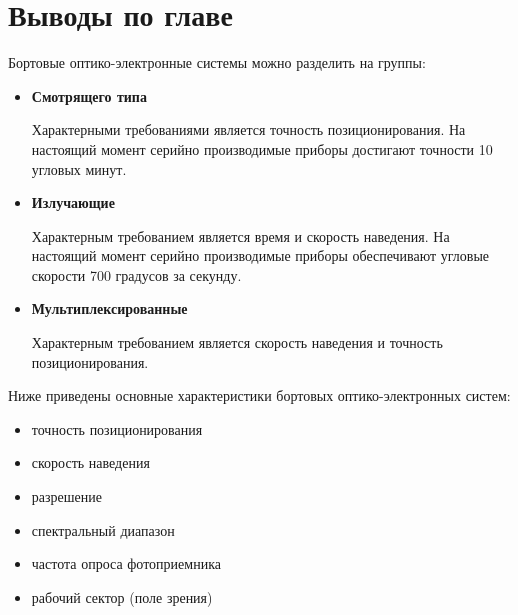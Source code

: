 \section{Выводы по главе} \label{sec:ch1/sec4-}

Бортовые оптико-электронные системы можно разделить на группы:
\begin{itemize}
	\item \textbf{Смотрящего типа}
	
	Характерными требованиями является точность позиционирования. На настоящий момент серийно производимые приборы достигают точности 10 угловых минут.
	
		
	\item \textbf{Излучающие}
	
	Характерным требованием является время и скорость наведения. На настоящий момент серийно производимые приборы обеспечивают угловые скорости 700 градусов за секунду.
	
	\item \textbf{Мультиплексированные}
	
	Характерным требованием является скорость наведения и точность позиционирования.
	
\end{itemize}

Ниже приведены основные характеристики бортовых оптико-электронных систем: 
\begin{itemize}
\item точность позиционирования
\item скорость наведения
\item разрешение 
\item спектральный диапазон
\item частота опроса фотоприемника
\item рабочий сектор (поле зрения)
\end{itemize}

